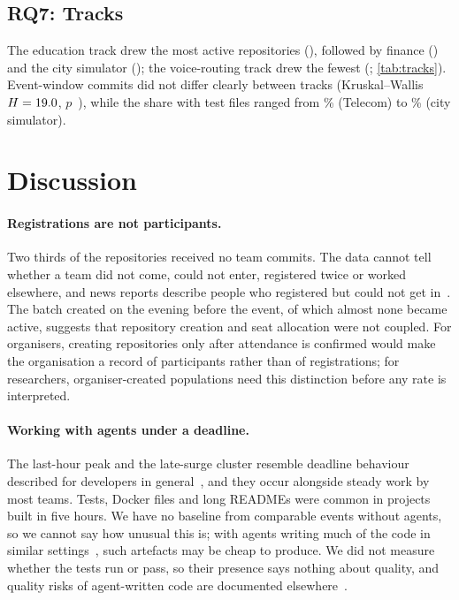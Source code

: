 \documentclass{article}
\begin{document}
\subsection{RQ7: Tracks}

The education track drew the most active repositories (\NTracksTZeroSevenN), followed by finance (\NTracksTZeroTwoN) and the city simulator (\NTracksTOneTwoN); the voice-routing track drew the fewest (\NTracksTZeroNineN; \cref{tab:tracks}). Event-window commits did not differ clearly between tracks (Kruskal--Wallis $H = \num{19.0}$, $p$~\NTrackCommitsKruskalP), while the share with test files ranged from \NTracksTZeroFourTests\% (Telecom) to \NTracksTOneTwoTests\% (city simulator).

\section{Discussion}\label{sec:discussion}

\paragraph{Registrations are not participants.}
Two thirds of the repositories received no team commits. The data cannot tell whether a team did not come, could not enter, registered twice or worked elsewhere, and news reports describe people who registered but could not get in~\cite{qumash2026queue,ulys2026survival}. The batch created on the evening before the event, of which almost none became active, suggests that repository creation and seat allocation were not coupled. For organisers, creating repositories only after attendance is confirmed would make the organisation a record of participants rather than of registrations; for researchers, organiser-created populations need this distinction before any rate is interpreted.

\paragraph{Working with agents under a deadline.}
The last-hour peak and the late-surge cluster resemble deadline behaviour described for developers in general~\cite{saghi2025procrastination}, and they occur alongside steady work by most teams. Tests, Docker files and long READMEs were common in projects built in five hours. We have no baseline from comparable events without agents, so we cannot say how unusual this is; with agents writing much of the code in similar settings~\cite{baumann2026swechat}, such artefacts may be cheap to produce. We did not measure whether the tests run or pass, so their presence says nothing about quality, and quality risks of agent-written code are documented elsewhere~\cite{agarwal2026aiides,zhao2025vibesafe,deng2026vibeinsecurity}.
\end{document}
